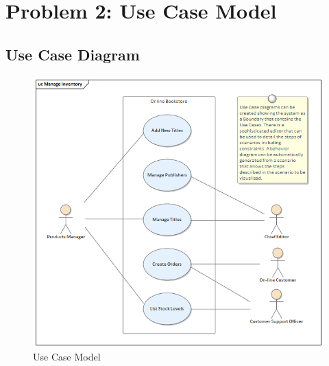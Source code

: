 \documentclass[english,12pt,a4paper]{report}
\begin{document}
	
	\chapter{Problem 2: Use Case Model}
	\section{Use Case Diagram}
	\begin{figure}[h]
		\centering
		\includegraphics[width=1\textwidth]{usecase.png} 
		\caption{Use Case Model}
		\label{fig:Use Case Model}
	\end{figure}
	
\end{document}
